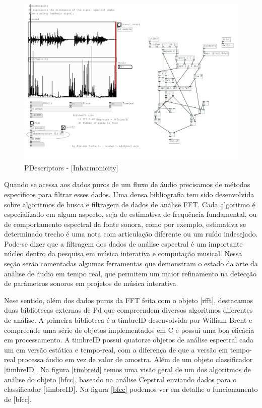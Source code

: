 \documentclass{ppgmus}
\begin{document}
\begin{figure}
\includegraphics[scale=.3]{pdescriptor}
\caption{PDescriptors - [Inharmonicity\texttildelow]}
\label{pdescriptor}
\end{figure} 


Quando se acessa aos dados puros de um fluxo de áudio precisamos de 
métodos específicos para filtrar esses dados. Uma densa bibliografia
tem sido desenvolvida sobre algoritmos de busca e filtragem de dados de
análise FFT. Cada algoritmo é especializado em algum aspecto, seja de
estimativa de frequência fundamental, ou de comportamento espectral da fonte sonora,
como por exemplo, estimativa se determinado trecho é uma nota com articulação diferente
ou um ruído indesejado.
Pode-se dizer que a filtragem dos dados de análise espectral é um importante
núcleo dentro da pesquisa em música interativa e computação musical. Nessa seção
serão comentadas algumas ferramentas que demonstram o estado da arte da análise de 
áudio em tempo real, que permitem um maior refinamento na detecção de parâmetros
sonoros em projetos de música interativa.

Nese sentido, além dos dados puros da FFT feita com o objeto [rfft\texttildelow],
destacamos duas bibliotecas externas de Pd que compreendem diversos algoritmos
diferentes de análise. A primeira biblioteca é a 
timbreID desenvolvida por William Brent e compreende uma série de objetos
implementados em C e possui uma boa eficácia em processamento. A timbreID possui 
quatorze objetos de análise espectral cada um em versão estática e tempo-real, com a diferença
de que a versão em tempo-real processa áudio em vez de valor de amostra. Além
de um objeto classificador [timbreID]. Na figura \ref{timbreid} temos
uma visão geral de um dos algoritmos de análise do objeto  [bfcc\texttildelow], baseado na 
análise Cepstral enviando dados para o classificador [timbreID]. Na figura \ref{bfcc} podemos
ver em detalhe o funcionamento de [bfcc\texttildelow].
\end{document}
